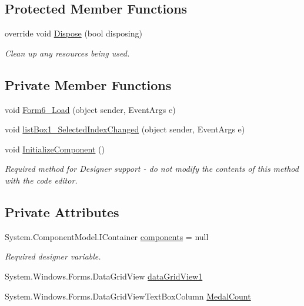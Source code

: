 \subsection*{Protected Member Functions}
\begin{DoxyCompactItemize}
\item 
override void \hyperlink{classPCO_1_1Display_a01f3f84c5b2a2aa6ff247840d1b0e409}{Dispose} (bool disposing)
\begin{DoxyCompactList}\small\item\em Clean up any resources being used. \end{DoxyCompactList}\end{DoxyCompactItemize}
\subsection*{Private Member Functions}
\begin{DoxyCompactItemize}
\item 
void \hyperlink{classPCO_1_1Display_aa744041d0020314937c76b8d6cf57f18}{Form6\+\_\+\+Load} (object sender, Event\+Args e)
\item 
void \hyperlink{classPCO_1_1Display_a6786ad6a582e4a7c95f1d9ecb1b73bea}{list\+Box1\+\_\+\+Selected\+Index\+Changed} (object sender, Event\+Args e)
\item 
void \hyperlink{classPCO_1_1Display_a6021b12cbb622cd9dde67e4f68d9dfb7}{Initialize\+Component} ()
\begin{DoxyCompactList}\small\item\em Required method for Designer support -\/ do not modify the contents of this method with the code editor. \end{DoxyCompactList}\end{DoxyCompactItemize}
\subsection*{Private Attributes}
\begin{DoxyCompactItemize}
\item 
System.\+Component\+Model.\+I\+Container \hyperlink{classPCO_1_1Display_a2ee7569345957e7ef1a938c63573dec4}{components} = null
\begin{DoxyCompactList}\small\item\em Required designer variable. \end{DoxyCompactList}\item 
System.\+Windows.\+Forms.\+Data\+Grid\+View \hyperlink{classPCO_1_1Display_a40e298d0adbdf8c69c05974007a9348c}{data\+Grid\+View1}
\item 
System.\+Windows.\+Forms.\+Data\+Grid\+View\+Text\+Box\+Column \hyperlink{classPCO_1_1Display_ab8487665b5430a76cd75c193a7cc0854}{Medal\+Count}
\end{DoxyCompactItemize}


